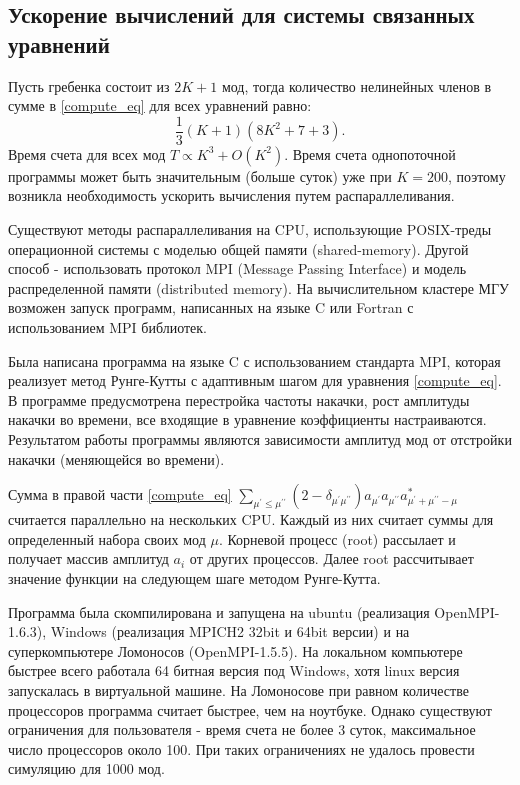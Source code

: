 \subsection{Ускорение вычислений для системы связанных уравнений}
Пусть гребенка состоит из $2K+1$ мод, тогда количество нелинейных членов в сумме в \eqref{compute_eq} для всех уравнений равно:
\begin{equation}
\frac{1}{3}(K+1)(8K^2+7+3).
\end{equation}
Время счета для всех мод $T\varpropto K^3+O(K^2)$. Время счета однопоточной программы может быть значительным (больше суток) уже при $K=200$, поэтому возникла необходимость ускорить вычисления путем распараллеливания.

Существуют методы распараллеливания на CPU, использующие POSIX-треды операционной системы с моделью общей памяти (shared-memory). Другой способ - использовать протокол MPI (Message Passing Interface) и модель распределенной памяти (distributed memory). На вычислительном кластере МГУ возможен запуск программ, написанных на языке C или Fortran с использованием MPI библиотек.

Была написана программа на языке C с использованием стандарта MPI, которая реализует метод Рунге-Кутты с адаптивным шагом для уравнения \eqref{compute_eq}. В программе предусмотрена перестройка частоты накачки, рост амплитуды накачки во времени, все входящие в уравнение коэффициенты настраиваются. Результатом работы программы являются зависимости амплитуд мод от отстройки накачки (меняющейся во времени).

Сумма в правой части \eqref{compute_eq} $\sum_{\mu^\prime\le\mu^{\prime\prime}} (2-\delta_{\mu^\prime\mu^{\prime\prime}})a_{\mu^\prime}a_{\mu^{\prime\prime}}a_{\mu^\prime+\mu^{\prime\prime}-\mu}^*$ считается параллельно на нескольких CPU. Каждый из них считает суммы для определенный набора своих мод $\mu$. Корневой процесс (root) рассылает и получает массив амплитуд $a_i$ от других процессов. Далее root рассчитывает значение функции на следующем шаге методом Рунге-Кутта.

Программа была скомпилирована и запущена на ubuntu (реализация OpenMPI-1.6.3), Windows (реализация MPICH2 32bit и 64bit версии) и на суперкомпьютере Ломоносов (OpenMPI-1.5.5). На локальном компьютере быстрее всего работала 64 битная версия под Windows, хотя linux версия запускалась в виртуальной машине. На Ломоносове при равном количестве процессоров программа считает быстрее, чем на ноутбуке. Однако существуют ограничения для пользователя - время счета не более 3 суток, максимальное число процессоров около 100. При таких ограничениях не удалось провести симуляцию для 1000 мод.

